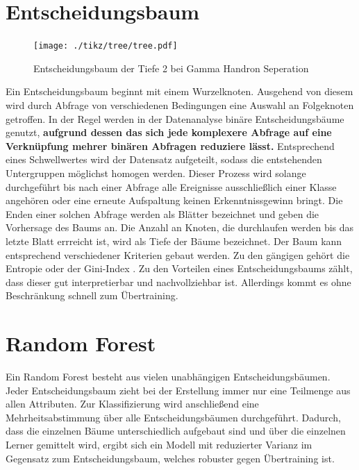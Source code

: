 \section{Entscheidungsbaum}
\begin{figure}
  \centering
  \texttt{[image: ./tikz/tree/tree.pdf]}
  \caption{Entscheidungsbaum der Tiefe 2 bei Gamma Handron Seperation}
\end{figure}
Ein Entscheidungsbaum beginnt mit einem Wurzelknoten. Ausgehend von diesem wird durch Abfrage von verschiedenen Bedingungen eine Auswahl an Folgeknoten getroffen. 
In der Regel werden in der Datenanalyse binäre Entscheidungsbäume genutzt, \textbf{aufgrund dessen das sich jede komplexere Abfrage auf eine Verknüpfung mehrer binären Abfragen reduziere lässt.}
Entsprechend eines Schwellwertes wird der Datensatz aufgeteilt, sodass die entstehenden Untergruppen möglichst homogen werden. 
Dieser Prozess wird solange durchgeführt bis nach einer Abfrage alle Ereignisse ausschließlich einer Klasse angehören oder eine erneute Aufspaltung keinen Erkenntnissgewinn bringt. Die Enden einer solchen Abfrage werden als Blätter bezeichnet und geben die Vorhersage des Baums an.
Die Anzahl an Knoten, die durchlaufen werden bis das letzte Blatt errreicht ist, wird als Tiefe der Bäume bezeichnet.
Der Baum kann entsprechend verschiedener Kriterien gebaut werden.
Zu den gängigen gehört die Entropie oder der Gini-Index \cite{MAchineLearningBook}. 
Zu den Vorteilen eines Entscheidungsbaums zählt, dass dieser gut interpretierbar und nachvollziehbar ist. 
Allerdings kommt es ohne Beschränkung schnell zum Übertraining.
\section{Random Forest}
Ein Random Forest besteht aus vielen unabhängigen Entscheidungsbäumen.
Jeder Entscheidungsbaum zieht bei der Erstellung immer nur eine Teilmenge aus allen Attributen.
Zur Klassifizierung wird anschließend eine Mehrheitsabstimmung über alle Entscheidungsbäumen durchgeführt.
Dadurch, dass die einzelnen Bäume unterschiedlich aufgebaut sind und über die einzelnen Lerner gemittelt wird, ergibt sich ein Modell mit reduzierter Varianz im Gegensatz zum Entscheidungsbaum, welches robuster gegen Übertraining ist.

